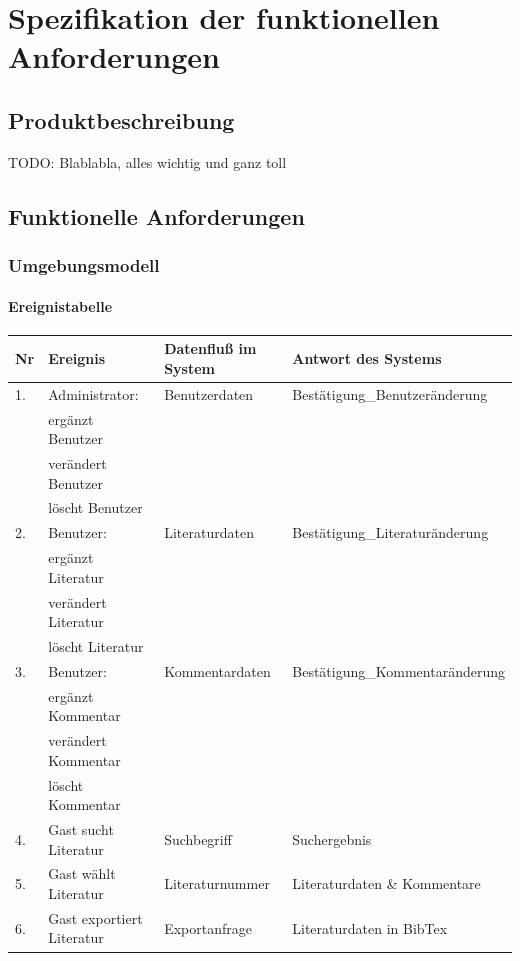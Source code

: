 \chapter{Spezifikation der funktionellen Anforderungen}
\section{Produktbeschreibung}
TODO: Blablabla, alles wichtig und ganz toll

\section{Funktionelle Anforderungen}
\subsection{Umgebungsmodell}

\subsubsection{Ereignistabelle}

\begin{tabular}[ht]{|l|l|l|l|}
\hline
Nr & Ereignis & Datenfluß im System & Antwort des Systems \\
\hline\hline
1. & Administrator: & Benutzerdaten & Best\"atigung\_Benutzer\"anderung \\
   & erg\"anzt Benutzer& & \\
   & ver\"andert Benutzer& & \\	
   & l\"oscht Benutzer& & \\	
\hline
2. & Benutzer: & Literaturdaten & Best\"atigung\_Literatur\"anderung \\
   & erg\"anzt Literatur & &  \\
   & ver\"andert Literatur & &  \\
   & l\"oscht Literatur & &  \\
\hline
3. & Benutzer: & Kommentardaten & Best\"atigung\_Kommentar\"anderung \\
   & erg\"anzt Kommentar & & \\
   & ver\"andert Kommentar & &\\
   & l\"oscht Kommentar & & \\
\hline
4. & Gast sucht Literatur& Suchbegriff & Suchergebnis \\
\hline
5. & Gast w\"ahlt Literatur & Literaturnummer & Literaturdaten \& Kommentare \\
\hline
6. & Gast exportiert Literatur & Exportanfrage & Literaturdaten in BibTex \\
\hline
\end{tabular}

